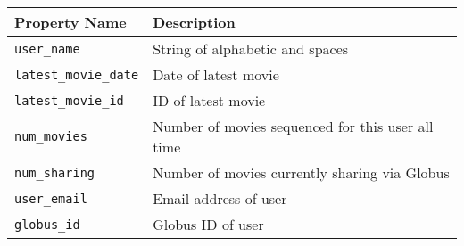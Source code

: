 \begin{tabularx}{\textwidth}{l|X}
\hline
 Property Name     & Description                                       \\
\hline
 \texttt{user\_name}         & String of alphabetic and spaces                   \\
 \texttt{latest\_movie\_date} & Date of latest movie                              \\
 \texttt{latest\_movie\_id}   & ID of latest movie                                \\
 \texttt{num\_movies}        & Number of movies sequenced for this user all time \\
 \texttt{num\_sharing}       & Number of movies currently sharing via Globus     \\
 \texttt{user\_email}        & Email address of user                             \\
 \texttt{globus\_id}         & Globus ID of user                                 \\
\hline
\end{tabularx}